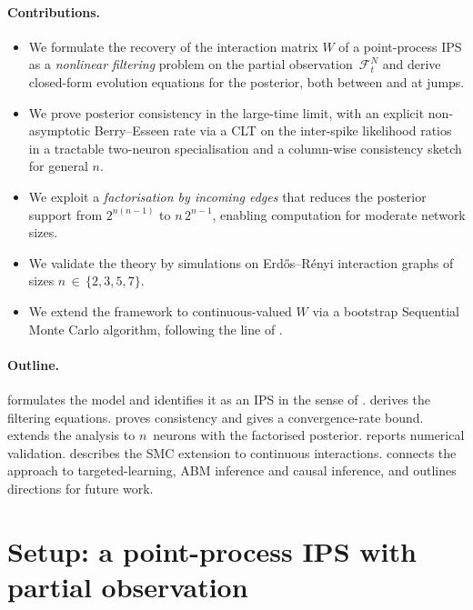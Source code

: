 \documentclass[11pt,a4paper]{article}
\theoremstyle{definition}
\newcommand{\cF}{\mathcal{F}}
\begin{document}
\paragraph{Contributions.}
\begin{itemize}[itemsep=2pt, topsep=2pt]
  \item We formulate the recovery of the interaction matrix $W$ of a
    point-process IPS as a \emph{nonlinear filtering} problem on the
    partial observation~$\cF_t^{N}$ and derive closed-form evolution
    equations for the posterior, both between and at jumps.
  \item We prove posterior consistency in the large-time limit, with
    an explicit non-asymptotic Berry--Esseen rate via a CLT on the
    inter-spike likelihood ratios in a tractable two-neuron specialisation and a
    column-wise consistency sketch for general $n$.
  \item We exploit a \emph{factorisation by incoming edges} that reduces
    the posterior support from $2^{n(n-1)}$ to $n\,2^{n-1}$, enabling
    computation for moderate network sizes.
  \item We validate the theory by simulations on Erd\H{o}s--R\'enyi
    interaction graphs of sizes $n\,\in\,\{2,3,5,7\}$.
  \item We extend the framework to continuous-valued $W$ via a bootstrap
    Sequential Monte Carlo algorithm, following the line of
    \citet{Lu2019}.
\end{itemize}

\paragraph{Outline.}
 formulates the model and identifies it as an IPS in
the sense of \citet{Liggett2005}.  derives the
filtering equations.  proves consistency and
gives a convergence-rate bound.  extends the
analysis to $n$~neurons with the factorised posterior.
 reports numerical validation.
 describes the SMC extension to continuous interactions.
 connects the approach to targeted-learning,
ABM inference and causal inference, and outlines directions for future
work.

\section{Setup: a point-process IPS with partial observation}
\label{sec:setup}
\end{document}
